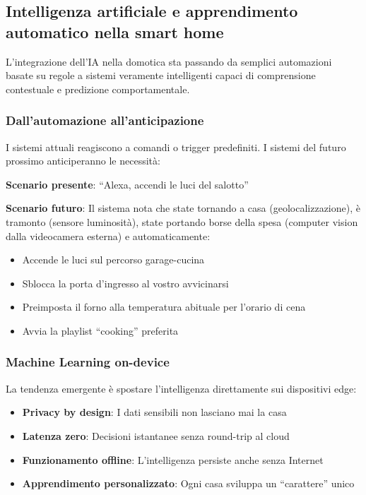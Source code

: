 \subsection{Intelligenza artificiale e apprendimento automatico nella smart home}

L'integrazione dell'IA nella domotica sta passando da semplici automazioni basate su regole a sistemi veramente intelligenti capaci di comprensione contestuale e predizione comportamentale.

\subsubsection{Dall'automazione all'anticipazione}

I sistemi attuali reagiscono a comandi o trigger predefiniti. I sistemi del futuro prossimo anticiperanno le necessità:

\textbf{Scenario presente}: ``Alexa, accendi le luci del salotto''

\textbf{Scenario futuro}: Il sistema nota che state tornando a casa (geolocalizzazione), è tramonto (sensore luminosità), state portando borse della spesa (computer vision dalla videocamera esterna) e automaticamente:
\begin{itemize}
    \item Accende le luci sul percorso garage-cucina
    \item Sblocca la porta d'ingresso al vostro avvicinarsi
    \item Preimposta il forno alla temperatura abituale per l'orario di cena
    \item Avvia la playlist ``cooking'' preferita
\end{itemize}

\subsubsection{Machine Learning on-device}

La tendenza emergente è spostare l'intelligenza direttamente sui dispositivi edge:

\begin{itemize}
    \item \textbf{Privacy by design}: I dati sensibili non lasciano mai la casa
    \item \textbf{Latenza zero}: Decisioni istantanee senza round-trip al cloud
    \item \textbf{Funzionamento offline}: L'intelligenza persiste anche senza Internet
    \item \textbf{Apprendimento personalizzato}: Ogni casa sviluppa un ``carattere'' unico
\end{itemize}

